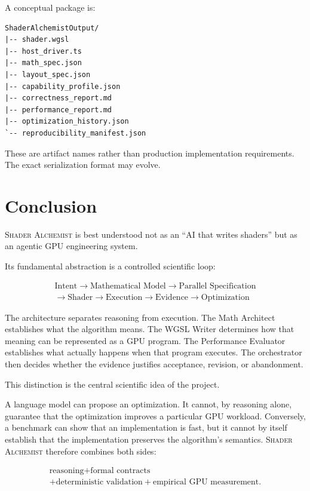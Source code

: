 \documentclass[11pt,a4paper,oneside]{report}
\newcommand{\SA}{\textsc{Shader Alchemist}}
\begin{document}
A conceptual package is:

\begin{lstlisting}[caption={Illustrative output package.}]
ShaderAlchemistOutput/
|-- shader.wgsl
|-- host_driver.ts
|-- math_spec.json
|-- layout_spec.json
|-- capability_profile.json
|-- correctness_report.md
|-- performance_report.md
|-- optimization_history.json
`-- reproducibility_manifest.json
\end{lstlisting}

These are artifact names rather than production implementation requirements. The exact serialization
format may evolve.

\chapter{Conclusion}

\SA{} is best understood not as an ``AI that writes shaders'' but as an agentic GPU engineering
system.

Its fundamental abstraction is a controlled scientific loop:

\[
\boxed{
\begin{gathered}
\text{Intent}\rightarrow\text{Mathematical Model}\rightarrow\text{Parallel Specification}\\
\rightarrow\text{Shader}\rightarrow\text{Execution}\rightarrow\text{Evidence}\rightarrow\text{Optimization}
\end{gathered}
}
\]

The architecture separates reasoning from execution. The Math Architect establishes what the
algorithm means. The WGSL Writer determines how that meaning can be represented as a GPU program.
The Performance Evaluator establishes what actually happens when that program executes. The
orchestrator then decides whether the evidence justifies acceptance, revision, or abandonment.

This distinction is the central scientific idea of the project.

A language model can propose an optimization. It cannot, by reasoning alone, guarantee that the
optimization improves a particular GPU workload. Conversely, a benchmark can show that an
implementation is fast, but it cannot by itself establish that the implementation preserves the
algorithm's semantics. \SA{} therefore combines both sides:

\[
\begin{gathered}
\text{reasoning}+\text{formal contracts}\\
+\text{deterministic validation}+\text{empirical GPU measurement}.
\end{gathered}
\]
\end{document}
